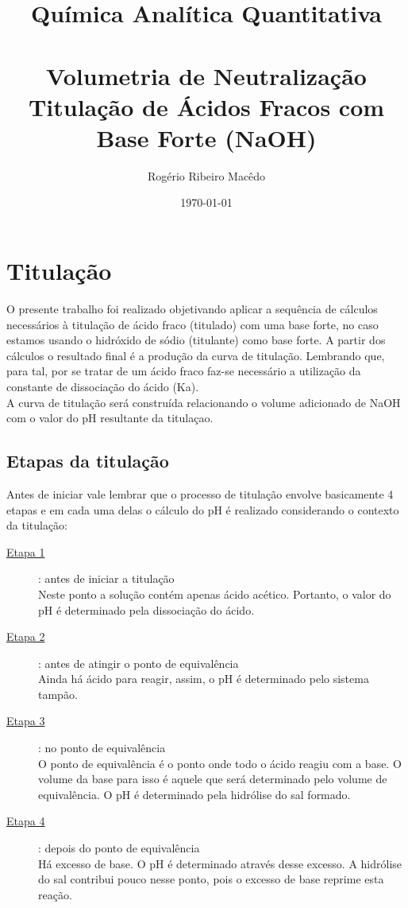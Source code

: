 \documentclass[a4paper, 12pt]{report}
\title{Química Analítica Quantitativa\\
	\large{\textbf{\\Volumetria de Neutralização \\
	Titulação de Ácidos Fracos com Base Forte (NaOH)}}
}
\author{Rogério Ribeiro Macêdo}
\date{\today}
\begin{document}
\maketitle
\tableofcontents
\newpage
\chapter{Titulação}
O presente trabalho foi realizado objetivando aplicar a sequência de cálculos necessários à titulação de ácido fraco (titulado) com uma base forte, no caso estamos usando o hidróxido de sódio (titulante) como base forte. A partir dos cálculos o resultado final é a produção da curva de titulação. Lembrando que, para tal, por se tratar de um ácido fraco faz-se necessário a utilização da constante de dissociação do ácido (Ka). \\

A curva de titulação será construída relacionando o volume adicionado de NaOH com o valor do pH resultante da titulaçao. 

\section{Etapas da titulação}
Antes de iniciar vale lembrar que o processo de titulação envolve basicamente 4 etapas e em cada uma delas o cálculo do pH é realizado considerando o contexto da titulação:

\begin{description}
	\item[\underline{Etapa 1}]: antes de iniciar a titulação \hfil \\ Neste ponto a solução contém apenas ácido acético. Portanto, o valor do pH é determinado pela dissociação do ácido.
	\item[\underline{Etapa 2}]: antes de atingir o ponto de equivalência \hfil \\ Ainda há ácido para reagir, assim, o pH é determinado pelo sistema tampão.
	\item[\underline{Etapa 3}]: no ponto de equivalência \hfil \\ O ponto de equivalência é o ponto onde todo o ácido reagiu com a base. O volume da base para isso é aquele que será determinado pelo volume de equivalência. O pH é determinado pela hidrólise do sal formado.
	\item[\underline{Etapa 4}]: depois do ponto de equivalência \hfil \\ Há excesso de base. O pH é determinado através desse excesso. A hidrólise do sal contribui pouco nesse ponto, pois o excesso de base reprime esta reação.
\end{description}
\end{document}
